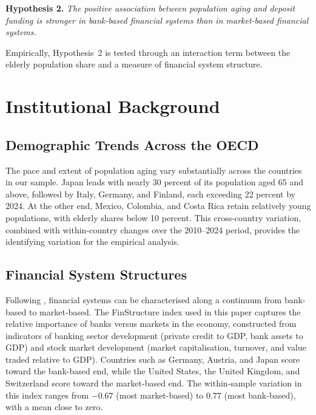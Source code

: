 \documentclass[12pt,a4paper]{article}
\begin{document}
\medskip
\noindent\textbf{Hypothesis 2.} \textit{The positive association between population aging and deposit funding is stronger in bank-based financial systems than in market-based financial systems.}
\medskip

Empirically, Hypothesis~2 is tested through an interaction term between the elderly population share and a measure of financial system structure.


\section{Institutional Background}
\label{sec:institutional}

\subsection{Demographic Trends Across the OECD}

The pace and extent of population aging vary substantially across the countries in our sample. Japan leads with nearly 30 percent of its population aged 65 and above, followed by Italy, Germany, and Finland, each exceeding 22 percent by 2024. At the other end, Mexico, Colombia, and Costa Rica retain relatively young populations, with elderly shares below 10 percent. This cross-country variation, combined with within-country changes over the 2010--2024 period, provides the identifying variation for the empirical analysis.

\subsection{Financial System Structures}

Following \citet{Levine2002}, financial systems can be characterised along a continuum from bank-based to market-based. The FinStructure index used in this paper captures the relative importance of banks versus markets in the economy, constructed from indicators of banking sector development (private credit to GDP, bank assets to GDP) and stock market development (market capitalisation, turnover, and value traded relative to GDP). Countries such as Germany, Austria, and Japan score toward the bank-based end, while the United States, the United Kingdom, and Switzerland score toward the market-based end. The within-sample variation in this index ranges from $-0.67$ (most market-based) to $0.77$ (most bank-based), with a mean close to zero.
\end{document}
